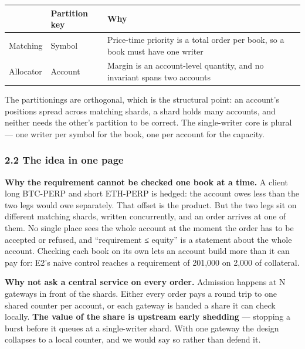 \documentclass[10pt,a4paper]{article}
\newcounter{none}  %
\begin{document}
{\def\LTcaptype{none} %
\begin{longtable}[]{@{}
  >{\raggedright\arraybackslash}p{}
  >{\raggedright\arraybackslash}p{}
  >{\raggedright\arraybackslash}p{}@{}}
\toprule\noalign{}
\begin{minipage}[b]{\linewidth}\raggedright
\end{minipage} & \begin{minipage}[b]{\linewidth}\raggedright
Partition key
\end{minipage} & \begin{minipage}[b]{\linewidth}\raggedright
Why
\end{minipage} \\
\midrule\noalign{}
\endhead
\bottomrule\noalign{}
\endlastfoot
Matching & Symbol & Price-time priority is a total order per book, so a book must have one writer \\
Allocator & Account & Margin is an account-level quantity, and no invariant spans two accounts \\
\end{longtable}
}

The partitionings are orthogonal, which is the structural point: an account's
positions spread across matching shards, a shard holds many accounts, and neither
needs the other's partition to be correct. The single-writer core is plural --- one
writer per symbol for the book, one per account for the capacity.

\subsubsection{2.2 The idea in one page}\label{the-idea-in-one-page}

\textbf{Why the requirement cannot be checked one book at a time.} A client long
BTC-PERP and short ETH-PERP is hedged: the account owes less than the two legs
would owe separately. That offset is the product. But the two legs sit on
different matching shards, written concurrently, and an order arrives at one of
them. No single place sees the whole account at the moment the order has to be
accepted or refused, and ``requirement ≤ equity'' is a statement about the whole
account. Checking each book on its own lets an account build more than it can
pay for: E2's naive control reaches a requirement of 201,000 on 2,000 of
collateral.

\textbf{Why not ask a central service on every order.} Admission happens at N
gateways in front of the shards. Either every order pays a round trip to one
shared counter per account, or each gateway is handed a share it can check
locally. \textbf{The value of the share is upstream early shedding} --- stopping a
burst before it queues at a single-writer shard. With one gateway the design
collapses to a local counter, and we would say so rather than defend it.
\end{document}
